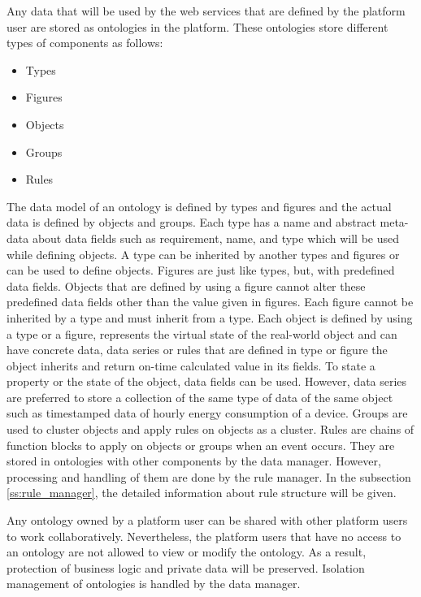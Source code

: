 Any data that will be used by the web services that are defined by the platform user are stored as ontologies in the platform. These ontologies store different types of components as follows:

\begin{itemize}
  \item Types
  \item Figures
  \item Objects
  \item Groups
  \item Rules
\end{itemize}

The data model of an ontology is defined by types and figures and the actual data is defined by objects and groups. Each type has a name and abstract meta-data about data fields such as requirement, name, and type which will be used while defining objects. A type can be inherited by another types and figures or can be used to define objects. Figures are just like types, but, with predefined data fields. Objects that are defined by using a figure cannot alter these predefined data fields other than the value given in figures. Each figure cannot be inherited by a type and must inherit from a type. Each object is defined by using a type or a figure, represents the virtual state of the real-world object and can have concrete data, data series or rules that are defined in type or figure the object inherits and return on-time calculated value in its fields. To state a property or the state of the object, data fields can be used. However, data series are preferred to store a collection of the same type of data of the same object such as timestamped data of hourly energy consumption of a device. Groups are used to cluster objects and apply rules on objects as a cluster. Rules are chains of function blocks to apply on objects or groups when an event occurs. They are stored in ontologies with other components by the data manager. However, processing and handling of them are done by the rule manager. In the subsection \ref{ss:rule_manager}, the detailed information about rule structure will be given.

Any ontology owned by a platform user can be shared with other platform users to work collaboratively. Nevertheless, the platform users that have no access to an ontology are not allowed to view or modify the ontology. As a result, protection of business logic and private data will be preserved. Isolation management of ontologies is handled by the data manager. 

